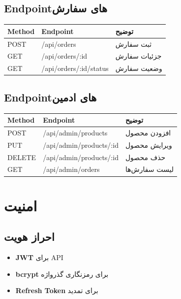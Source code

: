 \documentclass[12pt, a4paper]{article}
\begin{document}
\subsection{Endpointهای سفارش}

\begin{center}
\begin{tabular}{|l|l|l|}
\hline
\textbf{Method} & \textbf{Endpoint} & \textbf{توضیح} \\
\hline
POST & /api/orders & ثبت سفارش \\
\hline
GET & /api/orders/:id & جزئیات سفارش \\
\hline
GET & /api/orders/:id/status & وضعیت سفارش \\
\hline
\end{tabular}
\end{center}

\subsection{Endpointهای ادمین}

\begin{center}
\begin{tabular}{|l|l|l|}
\hline
\textbf{Method} & \textbf{Endpoint} & \textbf{توضیح} \\
\hline
POST & /api/admin/products & افزودن محصول \\
\hline
PUT & /api/admin/products/:id & ویرایش محصول \\
\hline
DELETE & /api/admin/products/:id & حذف محصول \\
\hline
GET & /api/admin/orders & لیست سفارش‌ها \\
\hline
\end{tabular}
\end{center}

\section{امنیت}

\subsection{احراز هویت}
\begin{itemize}
    \item \textbf{JWT} برای API
    \item \textbf{bcrypt} برای رمزنگاری گذرواژه
    \item \textbf{Refresh Token} برای تمدید
\end{itemize}
\end{document}

